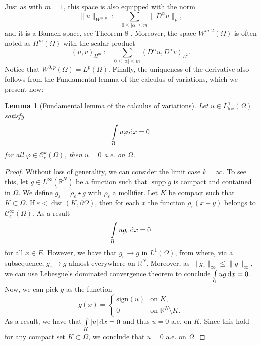 \documentclass[a4paper,doc,11pt]{article}
\newtheorem{lemma}[theorem]{Lemma}
\newcommand{\R}{\mathbb{R}}
\newcommand{\CC}{\mathcal{C}}
\DeclareMathOperator{\dist}{dist}
\DeclareMathOperator{\supp}{supp}
\begin{document}
Just as with \(m = 1\), this space is also equipped with the norm
\[
    \|u\|_{W^{m,p}} :=  \sum_{0\leq |\alpha| \leq m} \| D^\alpha u \|_p,
\]
and it is a Banach space, see Theorem 8 \citep{Ball2019}. Moreover, the space \(W^{m,2}(\Omega)\) is often noted as \(H^m (\Omega)\) with the scalar product
\[
    (u,v)_{H^m} := \sum_{0\leq |\alpha| \leq m}  (D^\alpha u, D^\alpha v)_{L^2}.
\]
Notice that \(W^{0,p} (\Omega) = L^p (\Omega)\). Finally, the uniqueness of the derivative also follows from the Fundamental lemma of the calculus of variations, which we present now:

\begin{lemma}[Fundamental lemma of the calculus of variations]
    Let \( u \in L^1_{\mathrm{loc}} (\Omega)\) satisfy 
    \[
        \int\limits_\Omega u \varphi \dif x = 0
    \]
    for all \(\varphi \in \CC^k_c (\Omega)\), then \( u = 0 \) a.e. on \(\Omega\).
\end{lemma}
\begin{proof}
    Without loss of generality, we can consider the limit case \(k = \infty\). To see this, let \( g \in L^{\infty} (\R^N)\) be a function such that \( \supp g\) is compact and contained in \(\Omega\). We define \( g_\varepsilon = \rho_\varepsilon \star g\) with \(\rho_\varepsilon\) a mollifier. Let \(K\) be compact such that \( K \subset \Omega\). If \(\varepsilon < \dist (K,\partial \Omega)\), then for each \(x\) the function \( \rho_\varepsilon (x - y)\) belongs to \( \CC^\infty_c (\Omega) \).
    As a result
    \[
         \int\limits_\Omega u g_\varepsilon \dif x = 0
    \]
    for all \( x\in E\). However, we have that \( g_\varepsilon \to g\) in \(L^1 (\Omega)\), from where, via a subsequence, \( g_\varepsilon \to g\) almost everywhere on \(\R^N\). Moreover, as \( \|g_\varepsilon\|_\infty \leq \|g\|_\infty\), we can use Lebesgue's dominated convergence theorem to conclude \( \int\limits_\Omega u g\dif x = 0\). Now, we can pick \(g\) as the function
    \[
        g(x) = 
        \begin{cases}
            \mathrm{sign}(u) & \text{on } K,
            \\
            0   & \text{on } \R^N \setminus K.
        \end{cases}
    \]
    As a result, we have that \( \int\limits_K |u| \dif x = 0\) and thus \( u = 0\) a.e. on \(K\). Since this hold for any compact set \(K \subset \Omega\), we conclude that \( u = 0 \) a.e. on \(\Omega\). 
\end{proof}
\end{document}
